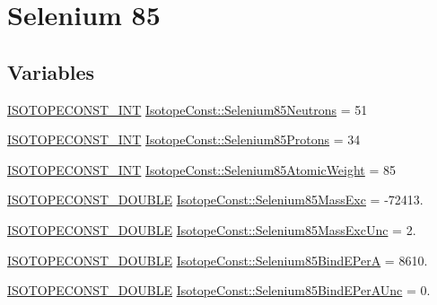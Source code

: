 \hypertarget{group___isotope_const-_selenium-_se85}{}\section{Selenium 85}
\label{group___isotope_const-_selenium-_se85}
\subsection*{Variables}
\begin{DoxyCompactItemize}
\item 
\mbox{\hyperlink{group___isotope_const-_macros_ga5f18360b3e99483a35c32d789e62621c}{I\+S\+O\+T\+O\+P\+E\+C\+O\+N\+S\+T\+\_\+\+I\+NT}} \mbox{\hyperlink{group___isotope_const-_selenium-_se85_ga5980a8472643e0f2956729a820f127fd}{Isotope\+Const\+::\+Selenium85\+Neutrons}} = 51
\item 
\mbox{\hyperlink{group___isotope_const-_macros_ga5f18360b3e99483a35c32d789e62621c}{I\+S\+O\+T\+O\+P\+E\+C\+O\+N\+S\+T\+\_\+\+I\+NT}} \mbox{\hyperlink{group___isotope_const-_selenium-_se85_gac154c6d2995bb151304aa070e0e0948d}{Isotope\+Const\+::\+Selenium85\+Protons}} = 34
\item 
\mbox{\hyperlink{group___isotope_const-_macros_ga5f18360b3e99483a35c32d789e62621c}{I\+S\+O\+T\+O\+P\+E\+C\+O\+N\+S\+T\+\_\+\+I\+NT}} \mbox{\hyperlink{group___isotope_const-_selenium-_se85_ga77cf1910e8355566d8dc8bb8fa1f64bc}{Isotope\+Const\+::\+Selenium85\+Atomic\+Weight}} = 85
\item 
\mbox{\hyperlink{group___isotope_const-_macros_ga8f45a7272ce02c0b4c65c44636ed719a}{I\+S\+O\+T\+O\+P\+E\+C\+O\+N\+S\+T\+\_\+\+D\+O\+U\+B\+LE}} \mbox{\hyperlink{group___isotope_const-_selenium-_se85_ga3ffad5c7e9959d4405d59291e34cefa8}{Isotope\+Const\+::\+Selenium85\+Mass\+Exc}} = -\/72413.
\item 
\mbox{\hyperlink{group___isotope_const-_macros_ga8f45a7272ce02c0b4c65c44636ed719a}{I\+S\+O\+T\+O\+P\+E\+C\+O\+N\+S\+T\+\_\+\+D\+O\+U\+B\+LE}} \mbox{\hyperlink{group___isotope_const-_selenium-_se85_ga5c2b5fad192e6cfde80d8de9420aad96}{Isotope\+Const\+::\+Selenium85\+Mass\+Exc\+Unc}} = 2.
\item 
\mbox{\hyperlink{group___isotope_const-_macros_ga8f45a7272ce02c0b4c65c44636ed719a}{I\+S\+O\+T\+O\+P\+E\+C\+O\+N\+S\+T\+\_\+\+D\+O\+U\+B\+LE}} \mbox{\hyperlink{group___isotope_const-_selenium-_se85_ga7569c9cee9b1fc11e0c02c065bbafd28}{Isotope\+Const\+::\+Selenium85\+Bind\+E\+PerA}} = 8610.
\item 
\mbox{\hyperlink{group___isotope_const-_macros_ga8f45a7272ce02c0b4c65c44636ed719a}{I\+S\+O\+T\+O\+P\+E\+C\+O\+N\+S\+T\+\_\+\+D\+O\+U\+B\+LE}} \mbox{\hyperlink{group___isotope_const-_selenium-_se85_ga06e1f37c6882914a34b9bf7a838298e8}{Isotope\+Const\+::\+Selenium85\+Bind\+E\+Per\+A\+Unc}} = 0.

\end{DoxyCompactItemize}
